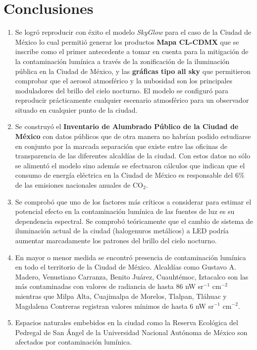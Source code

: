 \chapter{Conclusiones}
\label{chap:conclusiones}

\begin{enumerate}[I]

\item Se logró reproducir con éxito el modelo \textit{SkyGlow} para el caso de la Ciudad de México lo cual permitió generar los productos \textbf{Mapa CL-CDMX} que se inscribe como el primer antecedente a tomar en cuenta para la mitigación de la contaminación lumínica a través de la zonificación de la iluminación pública en la Ciudad de México, y las \textbf{gráficas tipo all sky} que permitieron comprobar que el aerosol atmosférico y la nubosidad son los principales moduladores del brillo del cielo nocturno. El modelo se configuró para reproducir prácticamente cualquier escenario atmosférico para un observador situado en cualquier punto de la ciudad.

\item Se construyó el \textbf{Inventario de Alumbrado Público de la Ciudad de México} con datos públicos que de otra manera no habrían podido estudiarse en conjunto por la marcada separación que existe entre las oficinas de transparencia de las diferentes alcaldías de la ciudad. Con estos datos no sólo se alimentó el modelo sino además se efectuaron cálculos que indican que el consumo de energía eléctrica en la Ciudad de México es responsable del 6\% de las emisiones nacionales anuales de CO$_2$.

\item Se comprobó que uno de los factores más críticos a considerar para estimar el potencial efecto en la contaminación lumínica de las fuentes de luz es su dependencia espectral. Se comprobó teóricamente que el cambio de sistema de iluminación actual de la ciudad (halogenuros metálicos) a LED podría aumentar marcadamente los patrones del brillo del cielo nocturno. 

\item En mayor o menor medida se encontró presencia de contaminación lumínica en todo el territorio de la Ciudad de México. Alcaldías como Gustavo A. Madero, Venustiano Carranza, Benito Juárez, Cuauhtémoc, Iztacalco son las más contaminadas con valores de radiancia de hasta 86 nW sr$^{-1}$ cm$^{-2}$ mientras que Milpa Alta, Cuajimalpa de Morelos, Tlalpan, Tláhuac y Magdalena Contreras registran valores mínimos de hasta 6 nW sr$^{-1}$ cm$^{-2}$.

\item Espacios naturales embebidos en la ciudad como la Reserva Ecológica del Pedregal de San Ángel de la Universidad Nacional Autónoma de México son afectados por contaminación lumínica.

\end{enumerate}